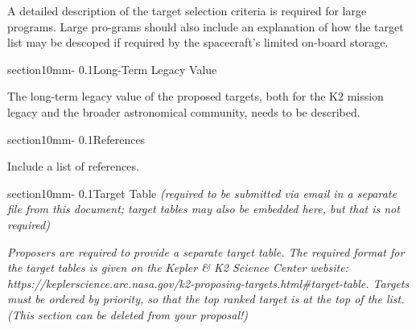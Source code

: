 \documentclass[letterpaper,11pt]{article}
\makeatletter
\renewcommand{\section}{\@startsection%
{section}{1}{0mm}{-\baselineskip}%
{0.1\baselineskip}{\normalfont\bfseries}}%
\makeatother
\begin{document}
A detailed description of the target selection criteria is required for large programs. Large pro-grams should also include an explanation of how the target list may be descoped if required by the spacecraft’s limited on-board storage. 

\section{Long-Term Legacy Value}

The long-term legacy value of the proposed targets, both for the K2 mission legacy and the broader astronomical community, needs to be described.

\section{References}

Include a list of references.

\section{Target Table \textit{(required to be submitted via email in a separate file from this document; target tables may also be embedded here, but that is not required)}}

\textit{Proposers are required to provide a separate target table. The required format for the target tables is given on the Kepler \& K2 Science Center website: https://keplerscience.arc.nasa.gov/k2-proposing-targets.html\#target-table. Targets must be ordered by priority, so that the top ranked target is at the top of the list. (This section can be deleted from your proposal!)}


\end{document}
